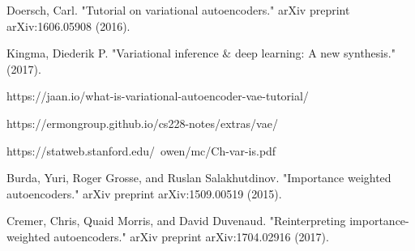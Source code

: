 \begin{thebibliography}{9}

Doersch, Carl. "Tutorial on variational autoencoders." arXiv preprint arXiv:1606.05908 (2016).

Kingma, Diederik P. "Variational inference \& deep learning: A new synthesis." (2017).

https://jaan.io/what-is-variational-autoencoder-vae-tutorial/

https://ermongroup.github.io/cs228-notes/extras/vae/

https://statweb.stanford.edu/~owen/mc/Ch-var-is.pdf

Burda, Yuri, Roger Grosse, and Ruslan Salakhutdinov. "Importance weighted autoencoders." arXiv preprint arXiv:1509.00519 (2015).

Cremer, Chris, Quaid Morris, and David Duvenaud. "Reinterpreting importance-weighted autoencoders." arXiv preprint arXiv:1704.02916 (2017).



\end{thebibliography}
